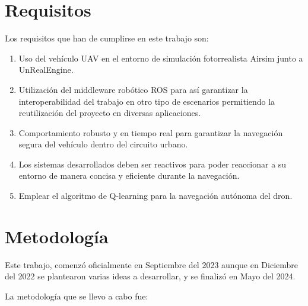 \section{Requisitos}
\label{sec:requisitos}

Los requisitos que han de cumplirse en este trabajo son: 
\begin{enumerate}
    \item Uso del vehículo UAV en el entorno de simulación fotorrealista Airsim junto a UnRealEngine.
    \item Utilización del middleware robótico ROS para así garantizar la interoperabilidad del trabajo en otro tipo de escenarios permitiendo
    la reutilización del proyecto en diversas aplicaciones. 
    \item Comportamiento robusto y en tiempo real para garantizar la navegación segura del vehículo dentro del circuito urbano.
    \item Los sistemas desarrollados deben ser reactivos para poder reaccionar a su entorno de manera concisa y eficiente durante
    la navegación.
    \item Emplear el algoritmo de Q-learning para la navegación autónoma del dron. 
\end{enumerate}


\section{Metodología}
\label{sec:metodologia}

Este trabajo, comenzó oficialmente en Septiembre del 2023 aunque en Diciembre del 2022 se plantearon varias ideas a desarrollar, y se finalizó en Mayo del 2024.

La metodología que se llevo a cabo fue:

